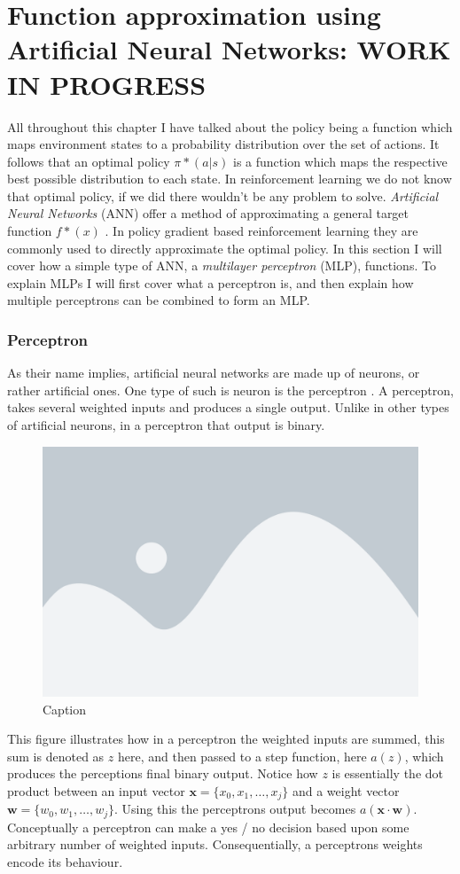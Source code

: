 \newpage
\section{Function approximation using Artificial Neural Networks: WORK IN PROGRESS}\label{sec:neural_networks}
All throughout this chapter I have talked about the policy being a function which maps environment states to a probability distribution over the set of actions. It follows that an optimal policy $\pi*(a|s)$ is a function which maps the respective best possible distribution to each state. In reinforcement learning we do not know that optimal policy, if we did there wouldn't be any problem to solve. \textit{Artificial Neural Networks} (ANN) offer a method of approximating a general target function $f*(x)$ \cite[p. 164]{Goodfellow-et-al-2016}. In policy gradient based reinforcement learning they are commonly used to directly approximate the optimal policy. In this section I will cover how a simple type of ANN, a \textit{multilayer perceptron} (MLP), functions. To explain MLPs I will first cover what a perceptron is, and then explain how multiple perceptrons can be combined to form an MLP.

\subsubsection{Perceptron}\label{subsubsec:nn:comp:perceptron}
As their name implies, artificial neural networks are made up of neurons, or rather artificial ones. One type of such is neuron is the perceptron \cite[chap. 1]{nielsen_neural_2015}. A perceptron, takes several weighted inputs and produces a single output. Unlike in other types of artificial neurons, in a perceptron that output is binary. 

\begin{figure}[H]
    \centering
    \includegraphics[width=0.6\linewidth]{figures/placeholder.png}
    \caption{Caption}
    \label{fig:my_label}
\end{figure}
\noindent
This figure illustrates how in a perceptron the weighted inputs are summed, this sum is denoted as $z$ here, and then passed to a step function, here $a(z)$, which produces the perceptions final binary output. Notice how $z$ is essentially the dot product between an input vector $\mathbf{x} = \{x_0, x_1, \dots, x_j\}$ and a weight vector $\mathbf{w} = \{ w_0, w_1, \dots, w_j \}$. Using this the perceptrons output becomes $a(\mathbf{x} \cdot \mathbf{w})$. Conceptually a perceptron can make a yes / no decision based upon some arbitrary number of weighted inputs. Consequentially, a perceptrons weights encode its behaviour. 

